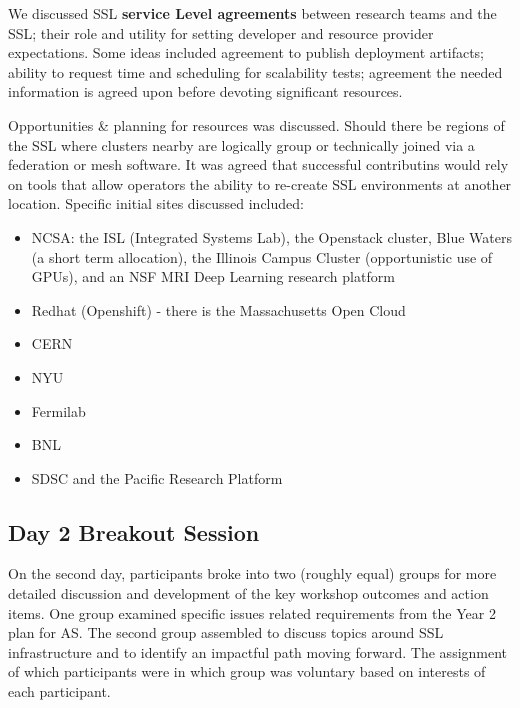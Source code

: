 \documentclass[11pt,letterpaper,fleqn]{article}
\begin{document}
We discussed SSL {\bf service Level agreements} between research teams and the SSL; their role and utility for setting developer and resource provider expectations.  Some ideas included agreement to publish deployment artifacts; ability to request time and scheduling for scalability tests;  agreement the needed information is agreed upon before devoting significant resources.

Opportunities \& planning for resources was discussed.  Should there be regions of the SSL where clusters nearby are logically group or technically joined via a federation or mesh software. It was agreed that successful contributins would rely on tools that allow operators the ability to re-create SSL environments at another location.  Specific initial sites discussed included:
\begin{itemize}
  \item NCSA: the ISL (Integrated Systems Lab), the Openstack cluster, Blue Waters (a short term allocation), the Illinois Campus Cluster (opportunistic use of GPUs), and an NSF MRI Deep Learning research platform
  \item Redhat (Openshift) - there is the Massachusetts Open Cloud
  \item CERN
  \item NYU
  \item Fermilab
  \item BNL
  \item SDSC and the Pacific Research Platform
\end{itemize}

\subsection{Day 2 Breakout Session}
\vspace{0.2cm}
On the second day, participants broke into two (roughly equal) groups for more detailed discussion and development of the key workshop outcomes and action items. One group examined specific issues related requirements from the Year 2 plan for AS. The second group assembled to discuss topics around SSL infrastructure and to identify an impactful path moving forward. The assignment of which participants were in which group was voluntary based on interests of each participant.
\end{document}
